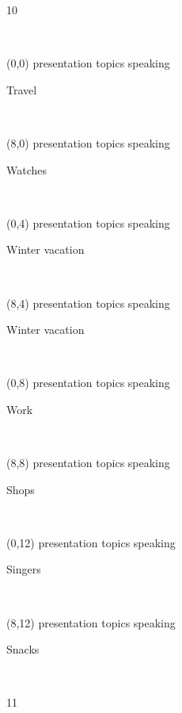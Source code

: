 \documentclass[a4paper]{article}
\newcommand{\mycard}[5]{%
	\small #1 #2
	\par
	\parbox[t][6.7cm][c]{9.5cm}{%
	\hspace{0.1cm} \Large#3\\
	\normalsize#4 #5
	}
}
\begin{document}
\begin{tiny}10\end{tiny}\\
\newpage

\begin{textblock}{8}(0,0)
\mycard{presentation topics}{speaking}{\parbox{9.0cm}{
\centering Travel          
}}{}{} 
\end{textblock}

\begin{textblock}{8}(8,0)
\mycard{presentation topics}{speaking}{\parbox{9.0cm}{
\centering Watches     
}}{}{} 
\end{textblock}

\begin{textblock}{8}(0,4)
\mycard{presentation topics}{speaking}{\parbox{9.0cm}{
\centering Winter vacation 
}}{}{} 
\end{textblock}

\begin{textblock}{8}(8,4)
\mycard{presentation topics}{speaking}{\parbox{9.0cm}{
\centering Winter vacation     
}}{}{} 
\end{textblock}

\begin{textblock}{8}(0,8)
\mycard{presentation topics}{speaking}{\parbox{9.0cm}{
\centering Work        
}}{}{} 
\end{textblock}

\begin{textblock}{8}(8,8)
\mycard{presentation topics}{speaking}{\parbox{9.0cm}{
\centering Shops       
}}{}{} 
\end{textblock}

\begin{textblock}{8}(0,12)
\mycard{presentation topics}{speaking}{\parbox{9.0cm}{
\centering Singers     
}}{}{} 
\end{textblock}

\begin{textblock}{8}(8,12)
\mycard{presentation topics}{speaking}{\parbox{9.0cm}{
\centering Snacks        
}}{}{} 
\end{textblock}

\begin{tiny}11\end{tiny}\\
\newpage
\end{document}
